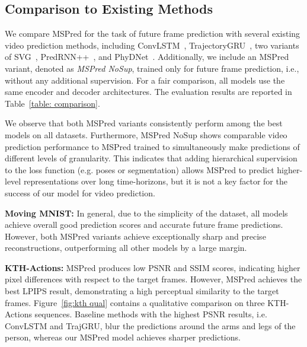 \documentclass{bmvc2k}
\newcommand{\Figure}[1]{Figure~\ref{#1}}
\newcommand{\Table}[1]{Table~\ref{#1}}
\begin{document}
\subsection{Comparison to Existing Methods}
\label{section: comparison}

We compare MSPred for the task of future frame prediction with several existing video prediction methods, including ConvLSTM~\cite{Shi_ConvLSTMNetworkPrecipitationNowcasting_2015}, TrajectoryGRU~\cite{Shi_DeepLearningForPrecipitationNowcastingBenchamrkAndModel_2017}, two variants of SVG~\cite{Denton_StochasticVideoGenerationWithALearnedPrior_2018}, PredRNN++~\cite{Wang_PredRNN_2021}, and PhyDNet~\cite{Guen_DisentanglingPhysiscalDynamicsFromUnknownFactorsForVideoPrediction_2020}.
Additionally, we include an MSPred variant, denoted as \emph{MSPred NoSup}, trained only for future frame prediction, i.e., without any additional supervision.
For a fair comparison, all models use the same encoder and decoder architectures.
The evaluation results are reported in \Table{table: comparison}.

We observe that both MSPred variants consistently perform among the best models on all datasets. 
Furthermore, MSPred NoSup shows comparable video prediction performance to MSPred trained to simultaneously make predictions of different levels of granularity.
This indicates that adding hierarchical supervision to the loss function (e.g. poses or segmentation) allows MSPred to predict higher-level representations over
long time-horizons, but it is not a key factor for the success of our model for video prediction.



\textbf{Moving MNIST:} In general, due to the simplicity of the dataset, all models achieve overall good prediction scores and accurate future frame predictions. However, both MSPred variants achieve exceptionally sharp and precise reconstructions, outperforming all other models by a large margin.


\textbf{KTH-Actions:} MSPred produces low PSNR and SSIM scores, indicating higher pixel differences with respect to the target frames. However, MSPred achieves the best LPIPS result, demonstrating a high perceptual similarity to the target frames.
\Figure{fig:kth qual} contains a qualitative comparison on three KTH-Actions sequences.
Baseline methods with the highest PSNR results, i.e. ConvLSTM and TrajGRU, blur the predictions around the arms and legs of the person, whereas our MSPred model achieves sharper predictions.
\end{document}
